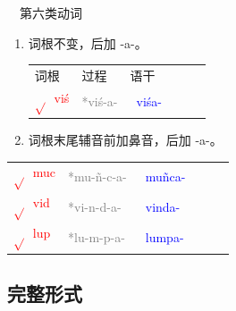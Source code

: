 \documentclass[17pt]{beamer}
\newcommand{\skt}[1]{{\sanskritfont{#1}}} %
\newcommand{\verbroot}[1]{\textcolor{red}{$\sqrt{}$#1}}
\newcommand{\sktroot}[1]{{\verbroot{\skt{#1}}}}
\newcommand{\skttransroot}[1]{{\sktroot{#1}~\textcolor{red}{#1}}}
\newcommand{\verbstem}[1]{\textcolor{blue}{#1\nobreakdash-}}
\newcommand{\sktverbstem}[1]{{\textcolor{blue}{\skt{#1\nobreakdash-}}}}
\newcommand{\skttransverbstem}[1]{{\sktverbstem{#1}~\verbstem{#1}}}
\begin{document}
\begin{frame}{\insertsubsection ~~第六类动词}
  \small
  \begin{enumerate}
    \item
      词根不变，后加 \nobreakdash-a\nobreakdash-。

      \begin{tabular}{@{}llllll@{}} %
        词根 & 过程 & 语干  \\
        \skttransroot{viś} & \textcolor{gray}{*viś-a-} & \skttransverbstem{viśa}  \\
      \end{tabular}
   
    \item
      词根末尾辅音前加鼻音，后加 \nobreakdash-a\nobreakdash-。
  \end{enumerate} 

  \centering
  \begin{tabular}{@{}llllll@{}} %
    \skttransroot{muc} & \textcolor{gray}{*mu-ñ-c-a-} & \skttransverbstem{muñca}  \\
    \skttransroot{vid} & \textcolor{gray}{*vi-n-d-a-} & \skttransverbstem{vinda}  \\
    \skttransroot{lup} & \textcolor{gray}{*lu-m-p-a-} & \skttransverbstem{lumpa}  \\
  \end{tabular}

\end{frame}

\subsection{完整形式}
\end{document}
